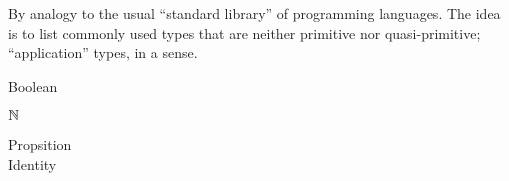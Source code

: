 \begin{remark}
  By analogy to the usual ``standard library'' of programming
  languages.  The idea is to list commonly used types that are neither
  primitive nor quasi-primitive; ``application'' types, in a sense.
\end{remark}


\begin{description}
\item [Boolean] \citep[p. 34]{hottbook}
\item [$\mathbb{N}$] \citep[p. 36]{hottbook}
\item [Propsition]
\item [Identity] 
\end{description}

